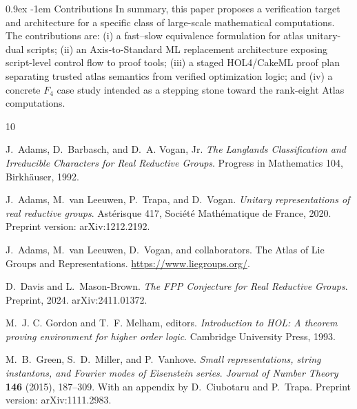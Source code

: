 \documentclass{easychair}
\makeatletter
\def\atlas{\textsf{atlas}\xspace}
\def\axis{\textsf{Axis}\xspace}
\def\sml{\textsf{Standard ML}\xspace}
\def\holfour{\textsf{HOL4}\xspace}
\def\cakeml{\textsf{CakeML}\xspace}
\renewcommand\paragraph{\@startsection{paragraph}{4}{\z@}%
  {0.9ex}   %
  {-1em}    %
  {\normalfont\normalsize\bfseries}}
\makeatother
\begin{document}
\paragraph{Contributions}
In summary, this paper proposes a verification target and architecture for a
specific class of large-scale mathematical computations.  The contributions are:
(i) a fast--slow equivalence formulation for \atlas{} unitary-dual scripts;
(ii) an \axis{}-to-\sml replacement architecture exposing script-level control
flow to proof tools; (iii) a staged \holfour/\cakeml proof plan separating
trusted \atlas{} semantics from verified optimization logic; and (iv) a concrete
\(F_4\) case study intended as a stepping stone toward the rank-eight Atlas
computations.
\fi

\begin{thebibliography}{10}



J.~Adams, D.~Barbasch, and D.~A. Vogan, Jr.
\newblock \emph{The Langlands Classification and Irreducible Characters for Real Reductive Groups}.
\newblock Progress in Mathematics 104, Birkh\"auser, 1992.


J.~Adams, M.~van Leeuwen, P.~Trapa, and D.~Vogan.
\newblock \emph{Unitary representations of real reductive groups}.
\newblock Ast\'erisque 417, Soci\'et\'e Math\'ematique de France, 2020.
\newblock Preprint version: arXiv:1212.2192.

J.~Adams, M.~van Leeuwen, D.~Vogan, and collaborators.
\newblock The Atlas of Lie Groups and Representations.
\newblock \url{https://www.liegroups.org/}.


D.~Davis and L.~Mason-Brown.
\newblock \emph{The FPP Conjecture for Real Reductive Groups}.
\newblock Preprint, 2024. arXiv:2411.01372.




M.~J. C. Gordon and T.~F. Melham, editors.
\newblock \emph{Introduction to HOL: A theorem proving environment for higher order logic}.
\newblock Cambridge University Press, 1993.


M.~B.~Green, S.~D.~Miller, and P.~Vanhove.
\newblock \emph{Small representations, string instantons, and Fourier modes of Eisenstein series}.
\newblock \emph{Journal of Number Theory} \textbf{146} (2015), 187--309.
\newblock With an appendix by D.~Ciubotaru and P.~Trapa.
\newblock Preprint version: arXiv:1111.2983.



\end{thebibliography}
\end{document}
